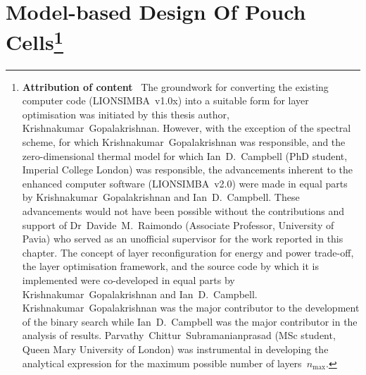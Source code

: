 
\graphicspath{{chapters/layer_opt/figures/}}

\chapter[Model-based Design of Pouch Cells]{%
    Model-based  Design Of  Pouch Cells\footnote{\textbf{Attribution  of content}  \
        The  groundwork  for converting  the  existing  computer code  (LIONSIMBA~v1.0x)
        into  a suitable  form  for  layer optimisation  was  initiated  by this  thesis
        author, \mbox{Krishnakumar  Gopalakrishnan}. However, with the  exception of the
        spectral scheme,  for which \mbox{Krishnakumar Gopalakrishnan}  was responsible,
        and  the  zero-dimensional  thermal  model for  which  \mbox{Ian  D.\  Campbell}
        (PhD  student,  Imperial  College  London)  was  responsible,  the  advancements
        inherent to the  enhanced computer software (LIONSIMBA~v2.0) were  made in equal
        parts by  \mbox{Krishnakumar Gopalakrishnan} and \mbox{Ian  D.\ Campbell}. These
        advancements would not have been  possible without the contributions and support
        of \mbox{Dr~Davide M.~Raimondo} (Associate  Professor, University of Pavia) who
        served as  an unofficial supervisor for  the work reported in  this chapter. The
        concept  of layer  reconfiguration for  energy  and power  trade-off, the  layer
        optimisation  framework,  and  the  source  code  by  which  it  is  implemented
        were  co-developed  in equal  parts  by  \mbox{Krishnakumar Gopalakrishnan}  and
        \mbox{Ian  D.\  Campbell}.  \mbox{Krishnakumar  Gopalakrishnan}  was  the  major
        contributor  to  the  development  of  the binary  search  while  \mbox{Ian  D.\
            Campbell} was the  major contributor in the analysis  of results. \mbox{Parvathy
        Chittur Subramanianprasad}  (MSc student, Queen  Mary University of  London) was
        instrumental in  developing the analytical  expression for the  maximum possible
    number of layers~$n_\text{max}$.}%
}\label{ch:modelbaseddesign}

\vspace*{-1em}
\renewcommand{\baselinestretch}{1.0}\normalsize %
\startcontents[chapters]
\printcontents[chapters]{}{1}{\setcounter{tocdepth}{1}}

